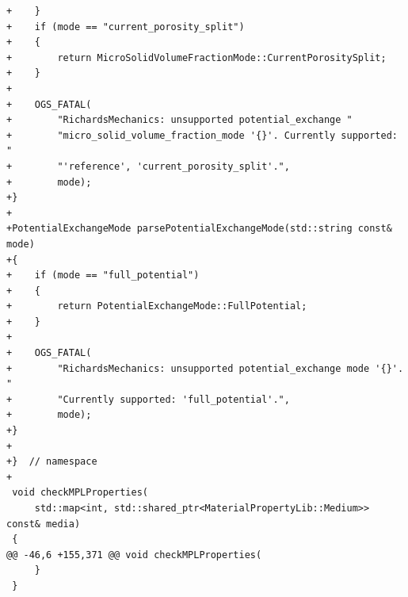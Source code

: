 \documentclass[10pt]{article}
\begin{document}
\begin{lstlisting}
+    }
+    if (mode == "current_porosity_split")
+    {
+        return MicroSolidVolumeFractionMode::CurrentPorositySplit;
+    }
+
+    OGS_FATAL(
+        "RichardsMechanics: unsupported potential_exchange "
+        "micro_solid_volume_fraction_mode '{}'. Currently supported: "
+        "'reference', 'current_porosity_split'.",
+        mode);
+}
+
+PotentialExchangeMode parsePotentialExchangeMode(std::string const& mode)
+{
+    if (mode == "full_potential")
+    {
+        return PotentialExchangeMode::FullPotential;
+    }
+
+    OGS_FATAL(
+        "RichardsMechanics: unsupported potential_exchange mode '{}'. "
+        "Currently supported: 'full_potential'.",
+        mode);
+}
+
+}  // namespace
+
 void checkMPLProperties(
     std::map<int, std::shared_ptr<MaterialPropertyLib::Medium>> const& media)
 {
@@ -46,6 +155,371 @@ void checkMPLProperties(
     }
 }
 

\end{lstlisting}
\end{document}
